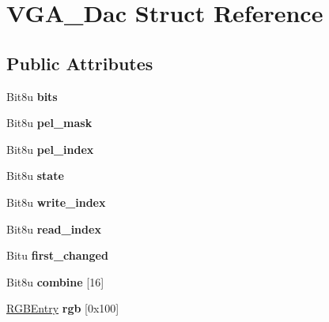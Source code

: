\hypertarget{structVGA__Dac}{\section{V\-G\-A\-\_\-\-Dac Struct Reference}
\label{structVGA__Dac}
}
\subsection*{Public Attributes}
\begin{DoxyCompactItemize}
\item 
\hypertarget{structVGA__Dac_a9c7b903b2ac45b26fa69585a467f90c4}{Bit8u {\bfseries bits}}\label{structVGA__Dac_a9c7b903b2ac45b26fa69585a467f90c4}

\item 
\hypertarget{structVGA__Dac_a0c1f0148e0c0168f99b9905c1d20e4fb}{Bit8u {\bfseries pel\-\_\-mask}}\label{structVGA__Dac_a0c1f0148e0c0168f99b9905c1d20e4fb}

\item 
\hypertarget{structVGA__Dac_aef96743c7903bd4c2068d29f3a628af0}{Bit8u {\bfseries pel\-\_\-index}}\label{structVGA__Dac_aef96743c7903bd4c2068d29f3a628af0}

\item 
\hypertarget{structVGA__Dac_a1171170967dad1ce34cb32794ac568e0}{Bit8u {\bfseries state}}\label{structVGA__Dac_a1171170967dad1ce34cb32794ac568e0}

\item 
\hypertarget{structVGA__Dac_ae13f3282fae336ab51c0302dd2288203}{Bit8u {\bfseries write\-\_\-index}}\label{structVGA__Dac_ae13f3282fae336ab51c0302dd2288203}

\item 
\hypertarget{structVGA__Dac_a72109e3946f7e0fc5be695a647eebc2c}{Bit8u {\bfseries read\-\_\-index}}\label{structVGA__Dac_a72109e3946f7e0fc5be695a647eebc2c}

\item 
\hypertarget{structVGA__Dac_a9c1452bee2039414f48393f6aceeb7e3}{Bitu {\bfseries first\-\_\-changed}}\label{structVGA__Dac_a9c1452bee2039414f48393f6aceeb7e3}

\item 
\hypertarget{structVGA__Dac_a9f40eda322d438d152e82a9416646bd3}{Bit8u {\bfseries combine} \mbox{[}16\mbox{]}}\label{structVGA__Dac_a9f40eda322d438d152e82a9416646bd3}

\item 
\hypertarget{structVGA__Dac_a400ca1f054244f958dd9faa57d206f42}{\hyperlink{structRGBEntry}{R\-G\-B\-Entry} {\bfseries rgb} \mbox{[}0x100\mbox{]}}\label{structVGA__Dac_a400ca1f054244f958dd9faa57d206f42}


\end{DoxyCompactItemize}
